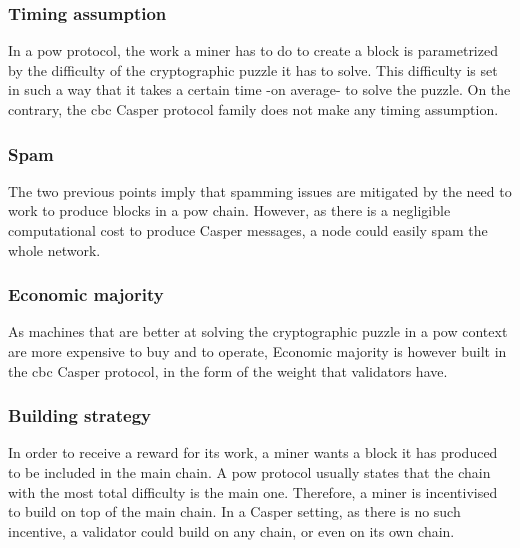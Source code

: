 \subsubsection{Timing assumption}
In a \gls{pow} protocol, the work a miner has to do to create a block is
parametrized by the difficulty of the cryptographic puzzle it has to solve. This
difficulty is set in such a way that it takes a certain time -on average- to
solve the puzzle. On the contrary, the \gls{cbc} Casper protocol family does not
make any timing assumption.

\subsubsection{Spam}
The two previous points imply that spamming issues are mitigated by the need to
work to produce blocks in a \gls{pow} chain. However, as there is a negligible
computational cost to produce Casper messages, a node could easily spam the
whole network.

\subsubsection{Economic majority}
As machines that are better at solving the cryptographic puzzle in a \gls{pow}
context are more expensive to buy and to operate, 
Economic majority is however built in the \gls{cbc} Casper protocol, in the form
of the weight that validators have.

\subsubsection{Building strategy}
In order to receive a reward for its work, a miner wants a block it has produced
to be included in the main chain. A \gls{pow} protocol usually states that the
chain with the most total difficulty is the main one. Therefore, a miner is
incentivised to build on top of the main chain. 
In a Casper setting, as there is no such incentive, a validator could build on
any chain, or even on its own chain.


